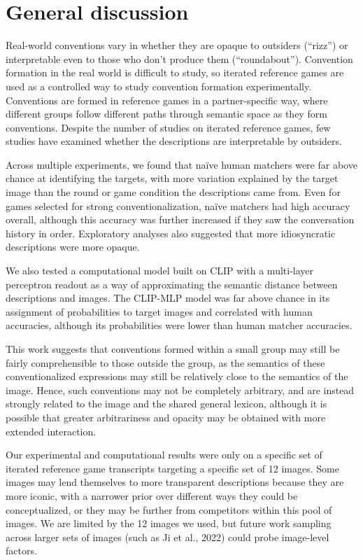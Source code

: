 \documentclass[10pt, letterpaper]{article}
\begin{document}
\section{General discussion}\label{general-discussion}

Real-world conventions vary in whether they are opaque to outsiders
(``rizz'') or interpretable even to those who don't produce them
(``roundabout''). Convention formation in the real world is difficult to
study, so iterated reference games are used as a controlled way to study
convention formation experimentally. Conventions are formed in reference
games in a partner-specific way, where different groups follow different
paths through semantic space as they form conventions. Despite the
number of studies on iterated reference games, few studies have examined
whether the descriptions are interpretable by outsiders.

Across multiple experiments, we found that naïve human matchers were far
above chance at identifying the targets, with more variation explained
by the target image than the round or game condition the descriptions
came from. Even for games selected for strong conventionalization, naïve
matchers had high accuracy overall, although this accuracy was further
increased if they saw the conversation history in order. Exploratory
analyses also suggested that more idiosyncratic descriptions were more
opaque.

We also tested a computational model built on CLIP with a multi-layer
perceptron readout as a way of approximating the semantic distance
between descriptions and images. The CLIP-MLP model was far above chance
in its assignment of probabilities to target images and correlated with
human accuracies, although its probabilities were lower than human
matcher accuracies.

This work suggests that conventions formed within a small group may
still be fairly comprehensible to those outside the group, as the
semantics of these conventionalized expressions may still be relatively
close to the semantics of the image. Hence, such conventions may not be
completely arbitrary, and are instead strongly related to the image and
the shared general lexicon, although it is possible that greater
arbitrariness and opacity may be obtained with more extended
interaction.

Our experimental and computational results were only on a specific set
of iterated reference game transcripts targeting a specific set of 12
images. Some images may lend themselves to more transparent descriptions
because they are more iconic, with a narrower prior over different ways
they could be conceptualized, or they may be further from competitors
within this pool of images. We are limited by the 12 images we used, but
future work sampling across larger sets of images (such as Ji et al.,
2022) could probe image-level factors.
\end{document}
